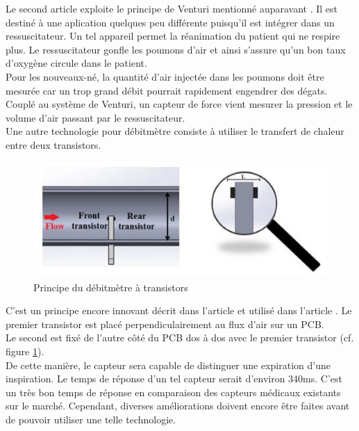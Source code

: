 Le second article exploite le principe de Venturi mentionné auparavant \cite{jacq_ultra-low_2011}. Il est destiné à une aplication 
quelques peu différente puisqu'il est  intégrer dans un ressuscitateur. Un tel appareil permet la réanimation du patient qui ne respire 
plus. Le ressuscitateur gonfle les poumons d'air et ainsi s'assure qu'un bon taux d'oxygène circule dans le patient. \\
Pour les nouveaux-né, la quantité d'air injectée dans les poumons doit être mesurée car un trop grand débit pourrait rapidement engendrer 
des dégats. \\
Couplé au système de Venturi, un capteur de force vient mesurer la pression et le volume d'air passant par le ressuscitateur. \\

Une autre technologie pour débitmètre consiste à utiliser le transfert de chaleur entre deux transistors. 
\begin{figure}[H]
    \centering
    \includegraphics[scale = 0.5]{images/Debitmetre_transistors.png}
    \caption{Principe du débitmètre à transistors}
    \label{fig:transistors}
\end{figure}
C'est un principe encore innovant décrit dans l'article \cite{giorgino_design_2014} et utilisé dans l'article \cite{rosi_device_2016}. 
Le premier transistor est placé perpendiculairement au flux d'air sur un PCB. \\
Le second est fixé de l'autre côté du PCB dos à dos avec le premier transistor (cf. figure \ref{fig:transistors}). \\
De cette manière, le capteur sera capable de distinguer une expiration d'une inspiration. Le temps de réponse d'un tel capteur serait 
d'environ 340ms. C'est un très bon temps de réponse en comparaison des capteurs médicaux existants sur le marché. Cependant, diverses améliorations 
doivent encore être faites avant de pouvoir utiliser une telle technologie. \\

